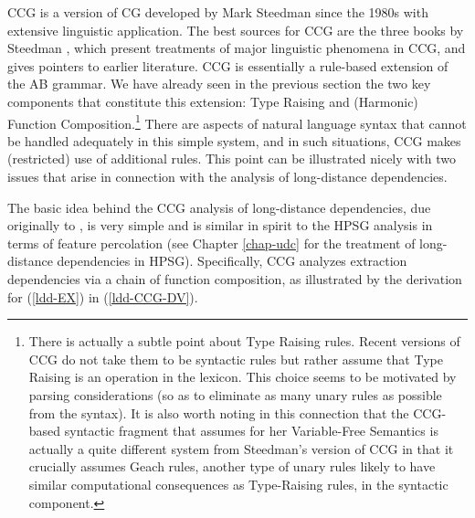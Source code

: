 \documentclass[output=paper]{langsci/langscibook}
\begin{document}
CCG is a version of CG developed by Mark Steedman since the 1980s with
extensive linguistic application. The best sources for CCG are the
three books by Steedman \citep{Steedman97a,Steedman2000a-u,steedman2012},
which present treatments of major linguistic phenomena in CCG, and
gives pointers to earlier literature. CCG is essentially a rule-based
extension of the AB grammar. We have already seen in the previous
section the two key components that constitute this extension: Type
Raising and (Harmonic) Function Composition.\footnote{There is
actually a subtle point about Type Raising rules. Recent
versions of CCG \citep{steedman2012} do not take them to be syntactic rules
but rather assume that Type Raising is an operation in the lexicon.
This choice seems to be motivated by 
parsing considerations (so as to eliminate as  many unary rules as
possible from the syntax). It is also worth noting in this
connection that the CCG-based syntactic fragment that
\citet{jacobson1999a,jacobson2000a} assumes for her Variable-Free Semantics
is actually a quite different system from Steedman's version of CCG in
that it crucially assumes Geach rules, another type of unary rules
likely to have similar computational consequences as Type-Raising rules, in the syntactic
component.} There are aspects of natural language syntax that cannot
be handled adequately in this simple system, and in such situations,
CCG makes (restricted) use of additional rules. This point can be
illustrated nicely with two issues that arise in connection with the
analysis of long-distance dependencies.

The basic idea behind the CCG analysis of long-distance dependencies,
due originally to \citet{AS82a}, is very simple and is similar in spirit to
the HPSG analysis in terms of \slasch feature percolation (see Chapter \ref{chap-udc}
for the treatment of long-distance dependencies in HPSG). Specifically,
CCG analyzes extraction dependencies via a chain of function
composition, as illustrated by the derivation for (\ref{ldd-EX}) in (\ref{ldd-CCG-DV}).
\end{document}
